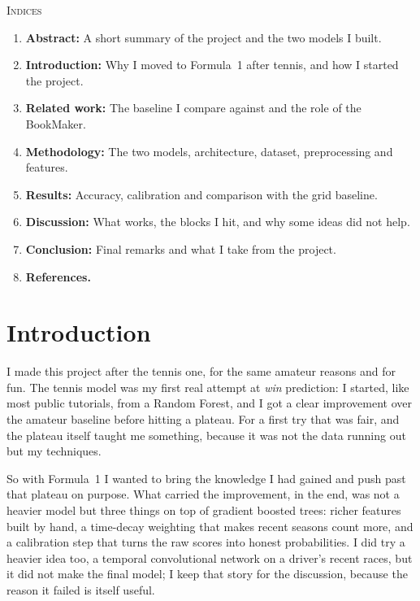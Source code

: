 \documentclass[10pt,twocolumn]{article}
\begin{document}
\begin{center}\scshape\large Indices\end{center}
\begin{enumerate}[leftmargin=1.4em,itemsep=2pt]
  \item[0.] \textbf{Abstract:} A short summary of the project and the two
            models I built.
  \item[1.] \textbf{Introduction:} Why I moved to Formula~1 after tennis, and
            how I started the project.
  \item[2.] \textbf{Related work:} The baseline I compare against and the role
            of the BookMaker.
  \item[3.] \textbf{Methodology:} The two models, architecture, dataset,
            preprocessing and features.
  \item[4.] \textbf{Results:} Accuracy, calibration and comparison with the
            grid baseline.
  \item[5.] \textbf{Discussion:} What works, the blocks I hit, and why some
            ideas did not help.
  \item[6.] \textbf{Conclusion:} Final remarks and what I take from the
            project.
  \item[7.] \textbf{References.}
\end{enumerate}

\section{Introduction}
I made this project after the tennis one, for the same amateur reasons and for
fun. The tennis model was my first real attempt at \emph{win} prediction: I
started, like most public tutorials, from a Random Forest, and I got a clear
improvement over the amateur baseline before hitting a plateau. For a first try
that was fair, and the plateau itself taught me something, because it was not
the data running out but my techniques.

So with Formula~1 I wanted to bring the knowledge I had gained and push past
that plateau on purpose. What carried the improvement, in the end, was not a
heavier model but three things on top of gradient boosted trees: richer
features built by hand, a time-decay weighting that makes recent seasons count
more, and a calibration step that turns the raw scores into honest
probabilities. I did try a heavier idea too, a temporal convolutional network
on a driver's recent races, but it did not make the final model; I keep that
story for the discussion, because the reason it failed is itself useful.
\end{document}
